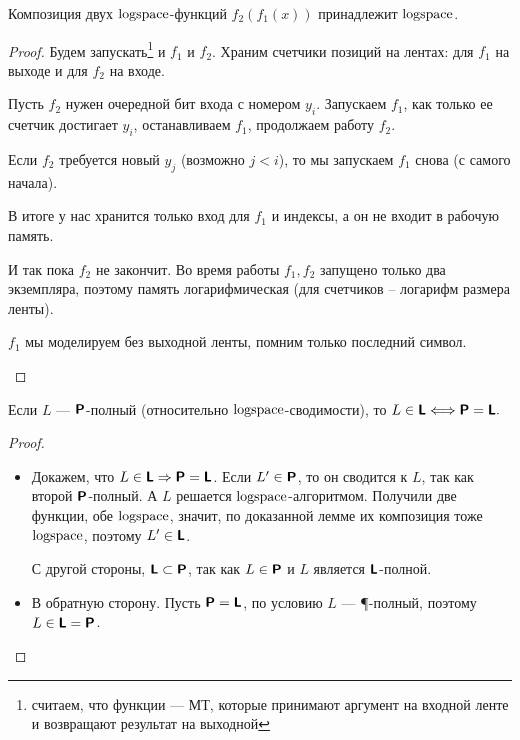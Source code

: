 \begin{lm}
	Композиция двух $ \logspace$-функций $ f_2(f_1(x))$ принадлежит $ \logspace$.
\end{lm}
\begin{proof}
    Будем запускать\footnote{считаем, что функции --- МТ, которые принимают аргумент на входной ленте и возвращают результат на выходной} и $ f_1$ и $ f_2$. Храним счетчики позиций на лентах: для $ f_1$ на выходе и для $ f_2$ на входе.

	Пусть $ f_2$ нужен очередной бит входа с номером $ y_i$. Запускаем $ f_1$, как только ее счетчик достигает $ y_i$, останавливаем $ f_1$, продолжаем работу $ f_2$.

	Если $ f_2$ требуется новый $ y_j$ (возможно $ j < i$), то мы запускаем $ f_1$ снова (с самого начала). 
	
	В итоге у нас хранится только вход для $f_1$ и индексы, а он не входит в рабочую память.

	И так пока $ f_2$ не закончит. Во время работы $ f_1, f_2$ запущено только два экземпляра, поэтому память логарифмическая (для счетчиков -- логарифм размера ленты).
	\begin{note}
	    $ f_1$ мы моделируем без выходной ленты, помним только последний символ.
	\end{note}
\end{proof}

\begin{thm}
	Если $ L$ --- $ \P$-полный (относительно $ \logspace$-сводимости), то
	$ L \in \L \Longleftrightarrow \P = \L.$
\end{thm}
\begin{proof}
\begin{itemize}
    \item Докажем, что $L \in \L \Rightarrow \P = \L$.
		Если $ L' \in \P$, то он сводится к $ L$, так как второй $ \P$-полный. А $ L$ решается $ \logspace$-алгоритмом. 
		Получили две функции, обе $ \logspace$, значит, по доказанной лемме их композиция тоже $\logspace$, поэтому $ L' \in \L$.
	
		С другой стороны, $\L \subset \P$, так как $L\in\P$ и $L$ является $\L$-полной. 
	\item В обратную сторону. Пусть $\P = \L$, по условию $L$ --- \P-полный,  поэтому $L \in \L = \P$.
\end{itemize}
\end{proof}
